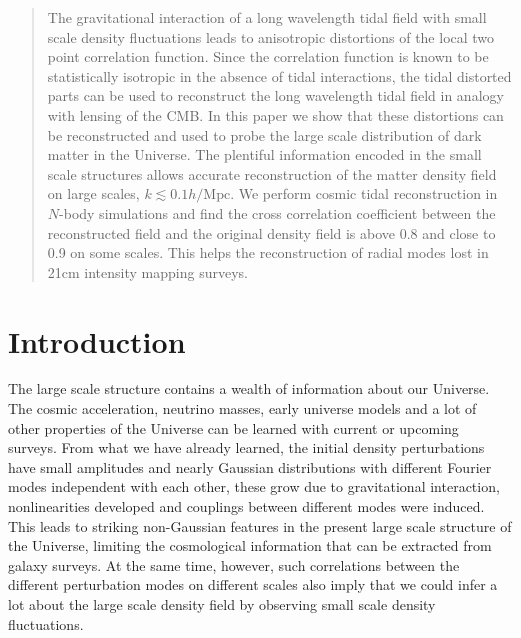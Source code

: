 \documentclass[aps,prd,twocolumn,showpacs,superscriptaddress,groupedaddress,nofootinbib]{revtex4}  %
\newcommand{\mr}{\mathrm}
\begin{document}
\begin{abstract}
The gravitational interaction of a long wavelength tidal field with
small scale density fluctuations leads to anisotropic distortions of the local 
two point correlation function.
Since the correlation function is known to be statistically 
isotropic in the absence of tidal interactions, the tidal distorted parts
can be used to reconstruct the long wavelength tidal field in analogy with
lensing of the CMB.
In this paper we show that these distortions can be reconstructed and used 
to probe the large scale distribution of dark matter in the Universe.
The plentiful information encoded in the small scale structures allows accurate
reconstruction of the matter density field on large scales, 
$k\lesssim0.1h/\mr{Mpc}$.
We perform cosmic tidal reconstruction in $N$-body simulations and find the 
cross correlation coefficient between the reconstructed field and the original
density field is above 0.8 and close to 0.9 on some scales.
This helps the reconstruction of radial modes lost in 21cm intensity mapping
surveys.

\end{abstract}

\pacs{}
\maketitle

\section{Introduction}
The large scale structure contains a wealth of information about our Universe.
The cosmic acceleration, neutrino masses, early universe models and a lot of 
other properties of the Universe can  be learned with current or upcoming surveys.
From what we have already learned,  the initial density perturbations have small amplitudes and 
nearly Gaussian distributions with different Fourier modes independent with each other, 
these grow due to gravitational interaction, nonlinearities developed and couplings 
between different modes were induced.
This leads to striking non-Gaussian features in the present large scale structure
of the Universe, limiting the cosmological information that can be extracted 
from galaxy surveys.
At the same time, however, such correlations between the different
perturbation modes on different scales also imply that we could infer a lot about the large scale 
density field by observing small scale density fluctuations.
\end{document}

